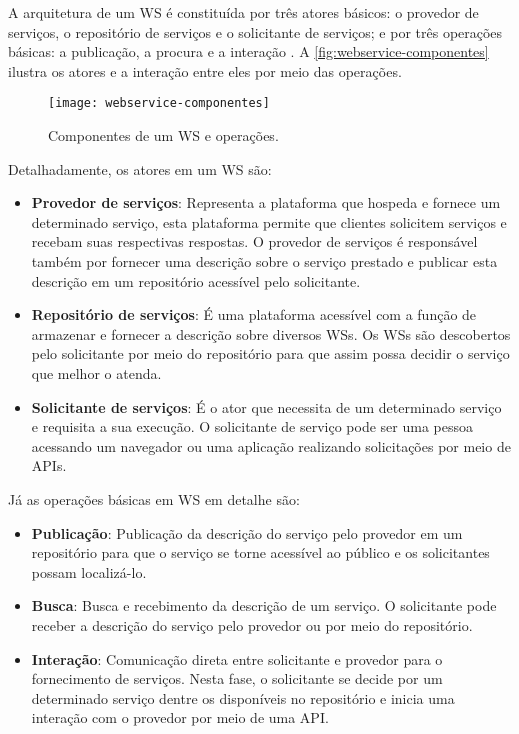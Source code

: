 A arquitetura de um WS é constituída por três atores básicos: o provedor de serviços, o repositório de serviços e o solicitante de serviços; e por três operações básicas: a publicação, a procura e a interação \cite{gottschalk2002webservices}. A \autoref{fig:webservice-componentes} ilustra os atores e a interação entre eles por meio das operações.

\begin{figure}[htb]
	\centering
	\texttt{[image: webservice-componentes]}
	\caption{Componentes de um WS e operações.}
	\label{fig:webservice-componentes}
\end{figure}

Detalhadamente, os atores em um WS são:

\begin{itemize}
	\item \textbf{Provedor de serviços}: Representa a plataforma que hospeda e fornece um determinado serviço, esta plataforma permite que clientes solicitem serviços e recebam suas respectivas respostas. O provedor de serviços é responsável também por fornecer uma descrição sobre o serviço prestado e publicar esta descrição em um repositório acessível pelo solicitante.

	\item \textbf{Repositório de serviços}: É uma plataforma acessível com a função de armazenar e fornecer a descrição sobre diversos WSs. Os WSs são descobertos pelo solicitante por meio do repositório para que assim possa decidir o serviço que melhor o atenda.

	\item \textbf{Solicitante de serviços}: É o ator que necessita de um determinado serviço e requisita a sua execução. O solicitante de serviço pode ser uma pessoa acessando um navegador ou uma aplicação realizando solicitações por meio de APIs.
\end{itemize}

Já as operações básicas em WS em detalhe são:

\begin{itemize}
	\item \textbf{Publicação}: Publicação da descrição do serviço pelo provedor em um repositório para que o serviço se torne acessível ao público e os solicitantes possam localizá-lo.

	\item \textbf{Busca}: Busca e recebimento da descrição de um serviço. O solicitante pode receber a descrição do serviço pelo provedor ou por meio do repositório.

	\item \textbf{Interação}: Comunicação direta entre solicitante e provedor para o fornecimento de serviços. Nesta fase, o solicitante se decide por um determinado serviço dentre os disponíveis no repositório e inicia uma interação com o provedor por meio de uma API.
\end{itemize}

